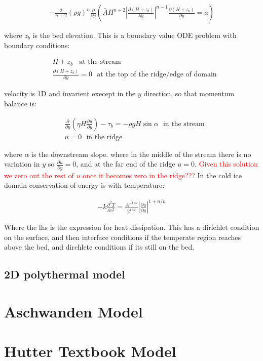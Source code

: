 \documentclass[a4paper,12pt]{article}
\newcommand{\pd}[2]{\frac{\partial #1}{\partial #2}}
\newcommand{\pdt}[2]{\frac{\partial^2 #1}{\partial #2 ^2}}
\begin{document}
\begin{align*}
  -\frac{2}{n+2}(\rho g)^n \pd{}{y}\left(\bar{A} H^{n+2}\left|\pd{(H + z_b)}{y}\right|^{n-1}\pd{(H+z_b)}{y} = \dot{a}\right)
\end{align*}

where $z_b$ is the bed elevation. This is a boundary value ODE problem with boundary conditions:

\begin{align*}
  &H + z_b ~~~~ \text{at the stream}\\
  &\pd{(H + z_b)}{y} = 0 ~~~ \text{at the top of the ridge/edge of domain}
\end{align*}

velocity is 1D and invarient execept in the $y$ direction, so that momentum balance is:

\begin{align*}
  &\pd{}{y}\left(\eta H\pd{u}{y}\right) - \tau_b = -\rho g H \sin \alpha ~~~ \text{in the stream}\\
  &u = 0 ~~~ \text{in the ridge}
  \end{align*}

  where $\alpha$ is the downstream slope. where in the middle of the stream there is no variation in $y$ so $\pd{u}{y} = 0$, and at the far end of the ridge $u = 0$. \textcolor{red}{Given this solution we zero out the rest of $u$ once it becomes zero in the ridge???}
  In the cold ice domain conservation of energy is with temperature:

\begin{align*}
  -k\pdt{T}{z} = \frac{\overline{A^{-1/n}}}{2^{1/n}}\left|\pd{u}{y}\right|^{1+n/n}
\end{align*}

Where the lhs is the expression for heat dissipation. This has a dirichlet condition on the surface, and then interface conditions if the temperate region reaches above the bed, and dirchlete conditions if its still on the bed.




\subsection{2D polythermal model}

\section{Aschwanden Model}

\section{Hutter Textbook Model}






{}

\end{document}
